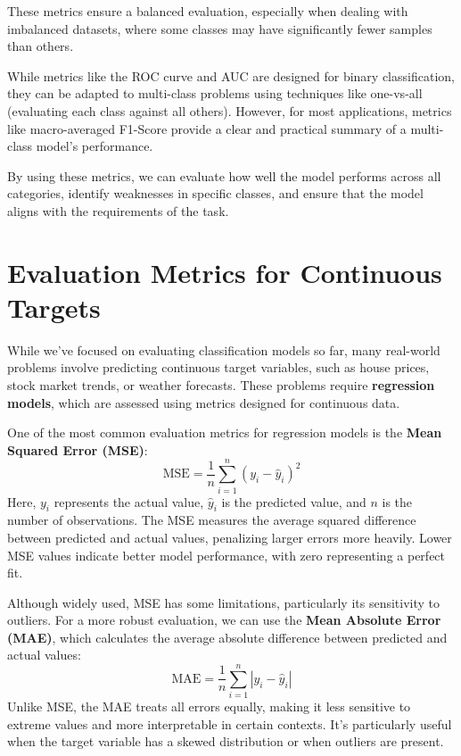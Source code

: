 \documentclass[
]{book}
\theoremstyle{definition}
\theoremstyle{definition}
\theoremstyle{definition}
\theoremstyle{definition}
\theoremstyle{remark}
\begin{document}
These metrics ensure a balanced evaluation, especially when dealing with imbalanced datasets, where some classes may have significantly fewer samples than others.

While metrics like the ROC curve and AUC are designed for binary classification, they can be adapted to multi-class problems using techniques like one-vs-all (evaluating each class against all others). However, for most applications, metrics like macro-averaged F1-Score provide a clear and practical summary of a multi-class model's performance.

By using these metrics, we can evaluate how well the model performs across all categories, identify weaknesses in specific classes, and ensure that the model aligns with the requirements of the task.

\section{Evaluation Metrics for Continuous Targets}\label{evaluation-metrics-for-continuous-targets}

While we've focused on evaluating classification models so far, many real-world problems involve predicting continuous target variables, such as house prices, stock market trends, or weather forecasts. These problems require \textbf{regression models}, which are assessed using metrics designed for continuous data.

One of the most common evaluation metrics for regression models is the \textbf{Mean Squared Error (MSE)}:
\[
\text{MSE} = \frac{1}{n} \sum_{i=1}^{n} (y_i - \hat{y}_i)^2
\]
Here, \(y_i\) represents the actual value, \(\hat{y}_i\) is the predicted value, and \(n\) is the number of observations. The MSE measures the average squared difference between predicted and actual values, penalizing larger errors more heavily. Lower MSE values indicate better model performance, with zero representing a perfect fit.

Although widely used, MSE has some limitations, particularly its sensitivity to outliers. For a more robust evaluation, we can use the \textbf{Mean Absolute Error (MAE)}, which calculates the average absolute difference between predicted and actual values:
\[
\text{MAE} = \frac{1}{n} \sum_{i=1}^{n} |y_i - \hat{y}_i|
\]
Unlike MSE, the MAE treats all errors equally, making it less sensitive to extreme values and more interpretable in certain contexts. It's particularly useful when the target variable has a skewed distribution or when outliers are present.
\end{document}
